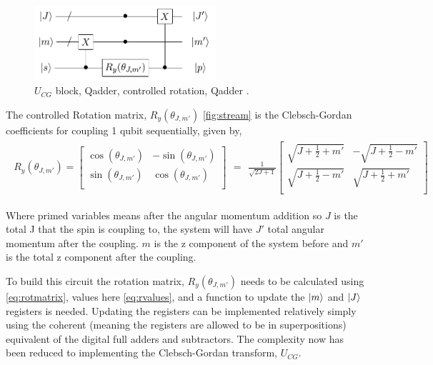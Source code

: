 \documentclass[12pt]{article}
\begin{document}
\begin{figure}[h!]
\centering
\includegraphics[width=0.6\textwidth]{genaddercirc.png}
\caption{$U_{CG}$ block, Qadder, controlled rotation, Qadder \cite{bacon2006efficient}.}
\label{fig:ucg}
\end{figure}

The controlled Rotation matrix, $R_y(\theta_{J,m'})$ \autoref{fig:stream} is the Clebsch-Gordan coefficients for coupling 1 qubit sequentially, given by,
\begin{align}
\begin{split}
R_y(\theta_{J,m'})=
\begin{bmatrix}
\cos(\theta_{J,m'}) &-\sin(\theta_{J,m'}) \\
\sin(\theta_{J,m'}) & \cos(\theta_{J,m'}) \\
\end{bmatrix}
\end{split}
=
\begin{split}
\frac{1}{\sqrt{2J+1}}
\begin{bmatrix}
\sqrt{J+\frac{1}{2}+m'} &-\sqrt{J+\frac{1}{2}-m'} \\
\sqrt{J+\frac{1}{2}-m'} & \sqrt{J+\frac{1}{2}+m'} \\
\end{bmatrix}
\end{split}
\label{eq:rotmatrix}
\end{align}

Where primed variables means after the angular momentum addition so $J$ is the total J that the spin is coupling to, the system will have $J'$ total angular momentum after the coupling. $m$ is the z component of the system before and $m'$ is the total z component after the coupling.

To build this circuit the rotation matrix, $R_y(\theta_{J,m'})$ needs to be calculated using \autoref{eq:rotmatrix}, values here \autoref{eq:rvalues}, and a function to update the $\left\vert{m}\right\rangle$ and $\left\vert{J}\right\rangle$ registers is needed. Updating the registers can be implemented relatively simply using the coherent (meaning the registers are allowed to be in superpositions) equivalent of the digital full adders and subtractors. The complexity now has been reduced to implementing the Clebsch-Gordan transform, $U_{CG}$.
\end{document}
